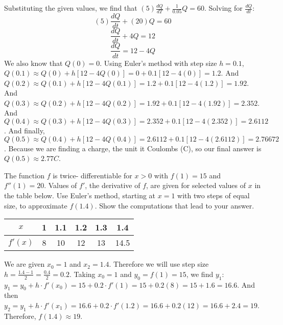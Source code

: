 \begin{Answer}[ref = eulercircuit]
Substituting the given values, we find that $(5)\frac{dQ}{dT} + \frac{1}{0.05}Q = 60$. Solving for $\frac{dQ}{dt}$:
$$(5) \frac{dQ}{dt} + (20)Q = 60$$
$$\frac{dQ}{dt} + 4Q = 12$$
$$\frac{dQ}{dt} = 12 - 4Q$$
We also know that $Q(0) = 0$. Using Euler's method with step size $h = 0.1$, $Q(0.1) \approx Q(0) + h \left[12 - 4Q(0) \right] = 0 + 0.1 \left[12 - 4(0) \right] = 1.2$. And $Q(0.2) \approx Q(0.1) + h \left[12 - 4Q(0.1) \right] = 1.2 + 0.1 \left[12 - 4(1.2) \right] = 1.92$. And $Q(0.3) \approx Q(0.2) + h \left[12 - 4Q(0.2) \right] = 1.92 + 0.1 \left[ 12 - 4(1.92) \right] = 2.352$. And $Q(0.4) \approx Q(0.3) + h \left[12 - 4Q(0.3) \right] = 2.352 + 0.1 \left[ 12 - 4(2.352) \right] = 2.6112$. And finally, $Q(0.5) \approx Q(0.4) + h \left[12 - 4Q(0.4) \right] = 2.6112 + 0.1 \left[12 - 4(2.6112) \right] = 2.76672$. Because we are finding a charge, the unit it Coulombs (C), so our final answer is $Q(0.5) \approx 2.77 C$.
\end{Answer}

\begin{Exercise} The function $f$ is twice-
differentiable for $x > 0$ with $f(1) = 15$ and $f''(1) = 20$. Values of $f'$, 
the derivative of $f$, are given for selected values of $x$ in the table 
below. Use Euler's method, starting at $x = 1$ with two steps of equal size, 
to approximate $f(1.4)$. Show the computations that lead to your answer. 
	\begin{center}
		\begin{tabular}{|c|c|c|c|c|c|}\hline
		$x$ & 1 & 1.1 & 1.2 & 1.3 & 1.4\\\hline
		$f'(x)$ & 8 & 10 & 12 & 13 & 14.5\\\hline
		\end{tabular}
	\end{center}
\end{Exercise} 

\begin{Answer}[ref = euler1]
We are given $x_0 = 1$ and $x_2 = 1.4$. Therefore we will use step size $h = 
\frac{1.4 - 1}{2} = \frac{0.4}{2} = 0.2$. Taking $x_0 = 1$ and $y_0 = f(1) = 
15$, we find $y_1$: $y_1 = y_0 + h \cdot f'(x_0) = 15 + 0.2 \cdot f'(1) = 15 + 
0.2(8) = 15 + 1.6 = 16.6$. And then $y_2 = y_1 + h \cdot f'(x_1) = 16.6 + 0.2 
\cdot f'(1.2) = 16.6 + 0.2(12) = 16.6 + 2.4 = 19$. Therefore, $f(1.4) \approx 
19$. 
\end{Answer}